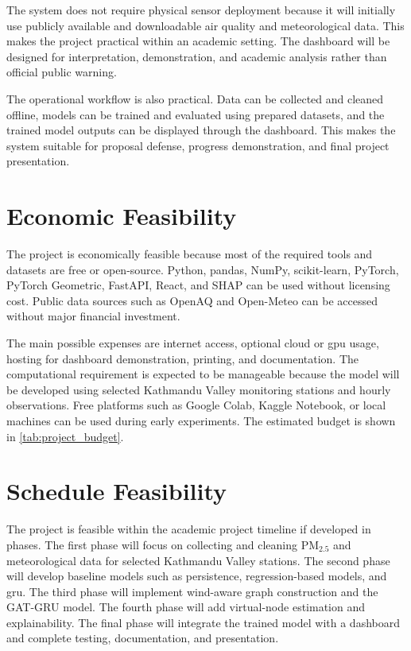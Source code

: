 The system does not require physical sensor deployment because it will initially use publicly available and downloadable air quality and meteorological data. This makes the project practical within an academic setting. The dashboard will be designed for interpretation, demonstration, and academic analysis rather than official public warning.

The operational workflow is also practical. Data can be collected and cleaned offline, models can be trained and evaluated using prepared datasets, and the trained model outputs can be displayed through the dashboard. This makes the system suitable for proposal defense, progress demonstration, and final project presentation.

\section{Economic Feasibility}
The project is economically feasible because most of the required tools and datasets are free or open-source. Python, pandas, NumPy, scikit-learn, PyTorch, PyTorch Geometric, FastAPI, React, and SHAP can be used without licensing cost. Public data sources such as OpenAQ and Open-Meteo can be accessed without major financial investment.

The main possible expenses are internet access, optional cloud or \gls{gpu} usage, hosting for dashboard demonstration, printing, and documentation. The computational requirement is expected to be manageable because the model will be developed using selected Kathmandu Valley monitoring stations and hourly observations. Free platforms such as Google Colab, Kaggle Notebook, or local machines can be used during early experiments. The estimated budget is shown in \cref{tab:project_budget}.

\section{Schedule Feasibility}
The project is feasible within the academic project timeline if developed in phases. The first phase will focus on collecting and cleaning PM$_{2.5}$ and meteorological data for selected Kathmandu Valley stations. The second phase will develop baseline models such as persistence, regression-based models, and \gls{gru}. The third phase will implement wind-aware graph construction and the GAT-GRU model. The fourth phase will add virtual-node estimation and explainability. The final phase will integrate the trained model with a dashboard and complete testing, documentation, and presentation.

